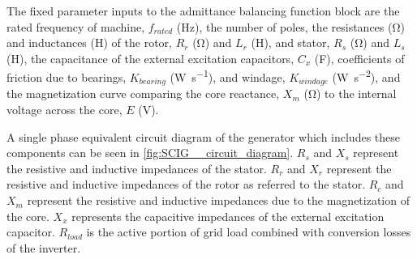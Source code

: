 The fixed parameter inputs to the admittance balancing function block are the rated frequency of machine, $f_{rated}$ (\si{\hertz}), the number of poles, the resistances (\si{\ohm}) and inductances (\si{\henry}) of the rotor, $R_r$ (\si{\ohm}) and $L_r$ (\si{\henry}), and stator, $R_s$ (\si{\ohm}) and $L_s$ (\si{\henry}), the capacitance of the external excitation capacitors, $C_x$ (\si{\farad}), coefficients of friction due to bearings, $K_{bearing}$ (\si{\watt\per\second}), and windage, $K_{windage}$ (\si{\watt\per\second\squared}), and the magnetization curve comparing the core reactance, $X_m$ (\si{\ohm}) to the internal voltage across the core, $E$ (\si{\volt}). 

A single phase equivalent circuit diagram of the generator which includes these components can be seen in \autoref{fig:SCIG__circuit_diagram}.  $R_s$ and $X_s$ represent the resistive and inductive impedances of the stator. $R_r$ and $X_r$ represent the resistive and inductive impedances of the rotor as referred to the stator. $R_c$ and $X_m$ represent the resistive and inductive impedances due to the magnetization of the core. $X_x$ represents the capacitive impedances of the external excitation capacitor. $R_{load}$ is the active portion of grid load combined with conversion losses of the inverter.


